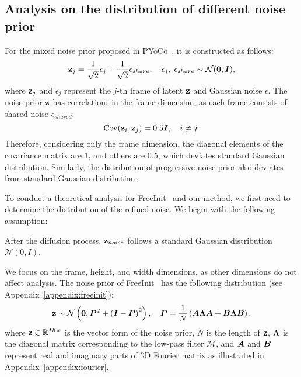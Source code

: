 \subsection{Analysis on the distribution of different noise prior}
\label{subsec:analysis}
For the mixed noise prior proposed in PYoCo~\citep{ge2023PYoCo}, it is constructed as follows:
\begin{equation}
    \mathbf{z}_j = \frac{1}{\sqrt{2}}\epsilon_j +  \frac{1}{\sqrt{2}}\epsilon_{share},\quad \epsilon_j,\;\epsilon_{share}\sim\mathcal{N}(\mathbf{0},{\bm{I}}),
\end{equation}
where $\mathbf{z}_j$ and $\epsilon_j$ represent the $j$-th frame of latent $\mathbf{z}$ and Gaussian noise $\epsilon$. 
The noise prior $\mathbf{z}$ has correlations in the frame dimension, as each frame consists of shared noise $\epsilon_{shared}$:
\begin{equation}
    \mathrm{Cov}(\mathbf{z}_i,\mathbf{z}_j) = 0.5{\bm{I}},\quad i\ne j.
\end{equation}
Therefore, considering only the frame dimension, the diagonal elements of the covariance matrix are 1, and others are 0.5, which deviates standard Gaussian distribution. 
Similarly, the distribution of progressive noise prior also deviates from standard Gaussian distribution.

To conduct a theoretical analysis for FreeInit~\citep{wu2023freeinit} and our method, we first need to determine the distribution of the refined noise. We begin with the following assumption:
\begin{assumption}
\label{assumption:1}
    After the diffusion process, $\mathbf{z}_{noise}$ follows a standard Gaussian distribution $\mathcal{N}(0,I)$.
\end{assumption}
We focus on the frame, height, and width dimensions, as other dimensions do not affect analysis.
The noise prior of FreeInit~\citep{wu2023freeinit} has the following distribution (see Appendix~\ref{appendix:freeinit}):
\begin{equation}
    \mathbf{z} \sim \mathcal{N}\left(\mathbf{0}, {\bm{P}}^2+\left({\bm{I}}-{\bm{P}}\right)^2\right), \quad {\bm{P}} = \frac{1}{N}\left( {\bm{A}}{\bm{\Lambda}}{\bm{A}}+{\bm{B}}{\bm{\Lambda}}{\bm{B}}\right),
\end{equation}
where $\mathbf{z}\in\mathbb{R}^{fhw}$ is the vector form of the noise prior, $N$ is the length of $\mathbf{z}$, ${\bm{\Lambda}}$ is the diagonal matrix corresponding to the low-pass filter $\mathcal{M}$, and ${\bm{A}}$ and ${\bm{B}}$ represent real and imaginary parts of 3D Fourier matrix as illustrated in Appendix~\ref{appendix:fourier}.

